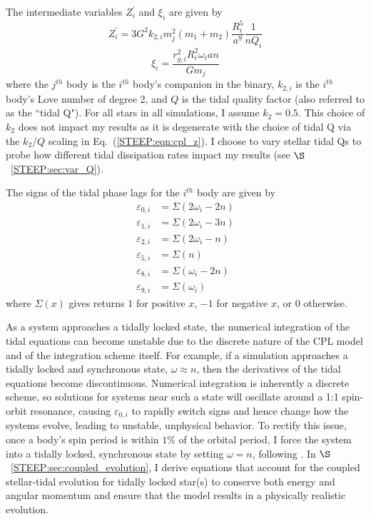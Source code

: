The intermediate variables $Z_i^{'}$ and $\xi_i$ are given by
\begin{equation} \label{STEEP:eqn:cpl_z}
Z_i^{'} = 3 G^2 k_{2,i} m_j^2 (m_1 + m_2) \frac{R_i^5}{a^9} \frac{1}{n Q_i}
\end{equation}
\begin{equation} \label{STEEP:eqn:cpl_xi}
\xi_i = \frac{r_{g,i}^2 R_i^2 \omega_i a n}{G m_j}
\end{equation}
where the $j^{th}$ body is the $i^{th}$ body's companion in the binary, $k_{2,i}$ is the $i^{th}$ body's Love number of degree 2, and $Q$ is the tidal quality factor (also referred to as the ``tidal Q").  For all stars in all simulations, I assume $k_2 = 0.5$.  This choice of $k_2$ does not impact my results as it is degenerate with the choice of tidal Q via the $k_2/Q$ scaling in Eq.~(\ref{STEEP:eqn:cpl_z}).  I choose to vary stellar tidal Qs to probe how different tidal dissipation rates impact my results (see $\S$~\ref{STEEP:sec:var_Q}).

The signs of the tidal phase lags for the $i^{th}$ body are given by
\begin{equation} \label{STEEP:eqn:cpl_eps}
\begin{split}
\varepsilon_{0,i} & = \Sigma(2 \omega_i - 2n) \\
\varepsilon_{1,i} & = \Sigma(2 \omega_i - 3n) \\
\varepsilon_{2,i} & = \Sigma(2 \omega_i - n) \\
\varepsilon_{5,i} & = \Sigma(n) \\
\varepsilon_{8,i} & = \Sigma(\omega_i - 2n) \\
\varepsilon_{9,i} & = \Sigma(\omega_i)
\end{split}
\end{equation}
where $\Sigma(x)$ gives returns $1$ for positive $x$, $-1$ for negative $x$, or $0$ otherwise.

As a system approaches a tidally locked state, the numerical integration of the tidal equations can become unstable due to the discrete nature of the CPL model and of the integration scheme itself.  For example, if a simulation approaches a tidally locked and synchronous state, $\omega \approx n$, then the derivatives of the tidal equations become discontinuous.  Numerical integration is inherently a discrete scheme, so solutions for systems near such a state will oscillate around a 1:1 spin-orbit resonance, causing $\varepsilon_{0,i}$ to rapidly switch signs and hence change how the systems evolve, leading to unstable, unphysical behavior.  To rectify this issue, once a body's spin period is within $1\%$ of the orbital period, I force the system into a tidally locked, synchronous state by setting $\omega = n$, following \citet{Barnes2013}.  In $\S$~\ref{STEEP:sec:coupled_evolution}, I derive equations that account for the coupled stellar-tidal evolution for tidally locked star(s) to conserve both energy and angular momentum and ensure that the model results in a physically realistic evolution.

